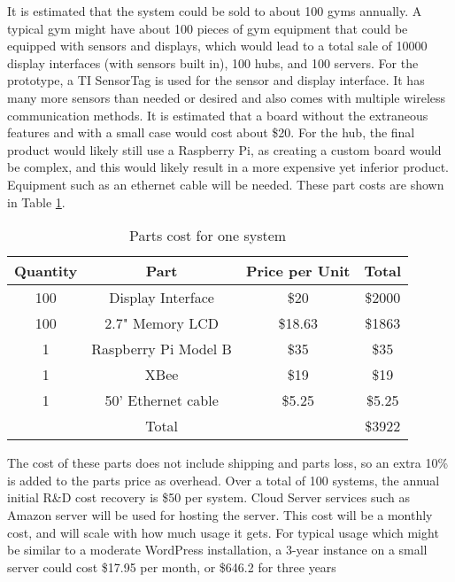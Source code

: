 \documentclass[PPFS.tex]{template/subfiles}
\begin{document}
        It is estimated that the system could be sold to about 100 gyms annually. A typical gym might have about 100 pieces of gym equipment that could be equipped with sensors and displays, which would lead to a total sale of 10000 display interfaces (with sensors built in), 100 hubs, and 100 servers. 
        For the prototype, a TI SensorTag is used for the sensor and display interface. It has many more sensors than needed or desired and also comes with multiple wireless communication methods. It is estimated that a board without the extraneous features and with a small case would cost about \$20.
        For the hub, the final product would likely still use a Raspberry Pi, as creating a custom board would be complex, and this would likely result in a more expensive yet inferior product. Equipment such as an ethernet cable will be needed.
        These part costs are shown in Table \ref{tab:prodPartsCost}.
        
        \begin{table}[H]
        	\begin{center}
        		\caption{Parts cost for one system}
        		\label{tab:prodPartsCost}
        		\begin{tabular}{|c|c|c|c|}
        			\hline
        			Quantity & Part & Price per Unit & Total\\
        			\hline
        			100 & Display Interface & \$20 & \$2000\\
        			\hline
        			100 & 2.7" Memory LCD & \$18.63 \cite{mouserMemoryLCD} & \$1863\\
        			\hline
        			1 & Raspberry Pi Model B & \$35 \cite{alliedRaspberryPi} & \$35\\
        			\hline
        			1 & XBee & \$19 \cite{mouserXBEE} & \$19\\
        			\hline
        			1 & 50' Ethernet cable & \$5.25 \cite{amazonEthernetCable} & \$5.25\\
        			\hline
        			&Total&& \$3922\\
        			\hline
        		\end{tabular}
        	\end{center}
        \end{table}
        
        The cost of these parts does not include shipping and parts loss, so an extra 10\% is added to the parts price as overhead. 
        Over a total of 100 systems, the annual initial R\&D cost recovery is \$50 per system.
        Cloud Server services such as Amazon server will be used for hosting the server. This cost will be a monthly cost, and will scale with how much usage it gets. For typical usage which might be similar to a moderate WordPress installation, a 3-year instance on a small server could cost \$17.95 per month, or \$646.2 for three years \cite{wordPressEstimate}
        
\end{document}

